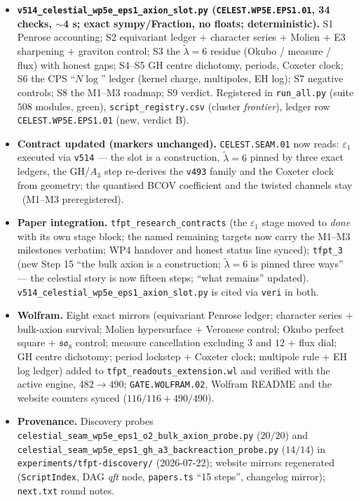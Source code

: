 \begin{itemize}[leftmargin=1.5em]
\item \textbf{\texttt{v514\_celestial\_wp5e\_eps1\_axion\_slot.py} (\texttt{CELEST.WP5E.EPS1.01},
34 checks, $\sim$4 s; exact sympy/Fraction, no floats; deterministic).} S1 Penrose accounting; S2
equivariant ledger $+$ character series $+$ Molien $+$ E3 sharpening $+$ graviton control; S3 the
$\tilde\lambda=6$ residue (Okubo / measure / flux) with honest gaps; S4--S5 GH centre dichotomy,
periods, Coxeter clock; S6 the CPS ``$N\log$'' ledger (kernel charge, multipoles, EH log); S7
negative controls; S8 the M1--M3 roadmap; S9 verdict. Registered in \texttt{run\_all.py} (suite
$508$ modules, green), \texttt{script\_registry.csv} (cluster \emph{frontier}), ledger row
\texttt{CELEST.WP5E.EPS1.01} (new, verdict B).
\item \textbf{Contract updated (markers unchanged).} \texttt{CELEST.SEAM.01} now reads:
$\varepsilon_1$ executed via \texttt{v514} --- the slot is a construction, $\tilde\lambda=6$
pinned by three exact ledgers, the GH/$A_3$ step re-derives the \texttt{v493} family and the
Coxeter clock from geometry; the quantised BCOV coefficient and the twisted channels stay \mO\
(M1--M3 preregistered).
\item \textbf{Paper integration.} \texttt{tfpt\_research\_contracts} (the $\varepsilon_1$ stage
moved to \emph{done} with its own stage block; the named remaining targets now carry the M1--M3
milestones verbatim; WP4 handover and honest status line synced); \texttt{tfpt\_3} (new Step 15
``the bulk axion is a construction; $\tilde\lambda=6$ is pinned three ways'' --- the celestial
story is now fifteen steps; ``what remains'' updated).
\texttt{v514\_celestial\_wp5e\_eps1\_axion\_slot.py} is cited via \texttt{veri} in both.
\item \textbf{Wolfram.} Eight exact mirrors (equivariant Penrose ledger; character series $+$
bulk-axion survival; Molien hypersurface $+$ Veronese control; Okubo perfect square $+$
$\mathfrak{so}_8$ control; measure cancellation excluding $3$ and $12$ $+$ flux dial; GH centre
dichotomy; period lockstep $+$ Coxeter clock; multipole rule $+$ EH log ledger) added to
\texttt{tfpt\_readouts\_extension.wl} and verified with the active engine, $482\to490$;
\texttt{GATE.WOLFRAM.02}, Wolfram README and the website counters synced ($116/116+490/490$).
\item \textbf{Provenance.} Discovery probes
\texttt{celestial\_seam\_}\allowbreak\texttt{wp5e\_eps1\_}\allowbreak\texttt{o2\_bulk\_}\allowbreak\texttt{axion\_probe.py}
($20/20$) and
\texttt{celestial\_seam\_}\allowbreak\texttt{wp5e\_eps1\_}\allowbreak\texttt{gh\_a3\_}\allowbreak\texttt{backreaction\_probe.py}
($14/14$) in \texttt{experiments/tfpt-discovery/} (2026-07-22); website mirrors regenerated
(\texttt{ScriptIndex}, DAG \emph{qft} node, \texttt{papers.ts} ``15 steps'', changelog mirror);
\texttt{next.txt} round notes.
\end{itemize}

